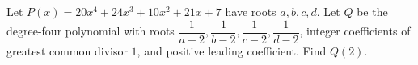Let $P(x)=20x^4+24x^3+10x^2+21x+7$ have roots $a,b,c,d$. Let $Q$ be the degree-four polynomial with roots $\dfrac{1}{a-2},\dfrac{1}{b-2},\dfrac{1}{c-2},\dfrac{1}{d-2}$, integer coefficients of greatest common divisor $1$, and positive leading coefficient. Find $Q(2)$.
